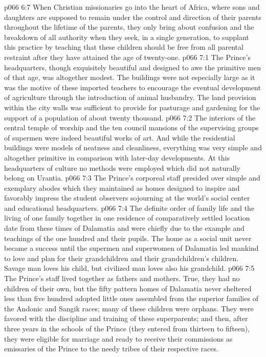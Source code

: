\vs p066 6:7 When Christian missionaries go into the heart of Africa, where sons and daughters are supposed to remain under the control and direction of their parents throughout the lifetime of the parents, they only bring about confusion and the breakdown of all authority when they seek, in a single generation, to supplant this practice by teaching that these children should be free from all parental restraint after they have attained the age of twenty\hyp{}one.
\vs p066 7:1 The Prince’s headquarters, though exquisitely beautiful and designed to awe the primitive men of that age, was altogether modest. The buildings were not especially large as it was the motive of these imported teachers to encourage the eventual development of agriculture through the introduction of animal husbandry. The land provision within the city walls was sufficient to provide for pasturage and gardening for the support of a population of about twenty thousand.
\vs p066 7:2 The interiors of the central temple of worship and the ten council mansions of the supervising groups of supermen were indeed beautiful works of art. And while the residential buildings were models of neatness and cleanliness, everything was very simple and altogether primitive in comparison with later\hyp{}day developments. At this headquarters of culture no methods were employed which did not naturally belong on Urantia.
\vs p066 7:3 The Prince’s corporeal staff presided over simple and exemplary abodes which they maintained as homes designed to inspire and favorably impress the student observers sojourning at the world’s social center and educational headquarters.
\pc \vs p066 7:4 The definite order of family life and the living of one family together in one residence of comparatively settled location date from these times of Dalamatia and were chiefly due to the example and teachings of the one hundred and their pupils. The home as a social unit never became a success until the supermen and superwomen of Dalamatia led mankind to love and plan for their grandchildren and their grandchildren’s children. Savage man loves his child, but civilized man loves also his grandchild.
\vs p066 7:5 The Prince’s staff lived together as fathers and mothers. True, they had no children of their own, but the fifty pattern homes of Dalamatia never sheltered less than five hundred adopted little ones assembled from the superior families of the Andonic and Sangik races; many of these children were orphans. They were favored with the discipline and training of these superparents; and then, after three years in the schools of the Prince (they entered from thirteen to fifteen), they were eligible for marriage and ready to receive their commissions as emissaries of the Prince to the needy tribes of their respective races.
